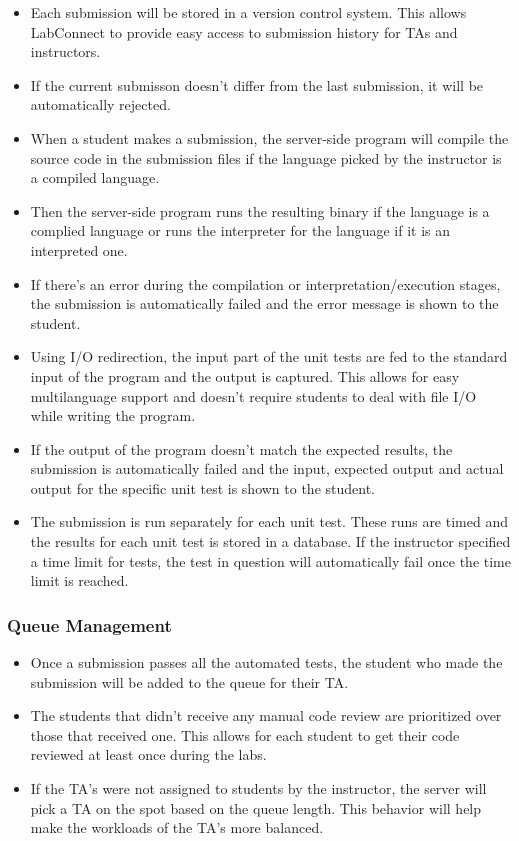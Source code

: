 \documentclass[a4paper, 12pt]{article}
\begin{document}
    \begin{itemize}
      \item Each submission will be stored in a version control system. This allows LabConnect to provide easy access to
      submission history for TAs and instructors.
      \item If the current submisson doesn't differ from the last submission, it will be automatically rejected.
      \item When a student makes a submission, the server-side program will compile the source code in the submission
      files if the language picked by the instructor is a compiled language.
      \item Then the server-side program runs the resulting binary if the language is a complied language or runs the
      interpreter for the language if it is an interpreted one.
      \item If there's an error during the compilation or interpretation/execution stages, the submission is automatically failed and
      the error message is shown to the student.
      \item Using I/O redirection, the input part of the unit tests are fed to the standard input of the program and the output is captured.
      This allows for easy multilanguage support and doesn't require students to deal with file I/O while writing the program.
      \item If the output of the program doesn't match the expected results, the submission is automatically failed and the input, expected
      output and actual output for the specific unit test is shown to the student.
      \item The submission is run separately for each unit test. These runs are timed and the results for each unit test is stored in a database.
      If the instructor specified a time limit for tests, the test in question will automatically fail once the time limit is reached.
    \end{itemize}

    \subsubsection{Queue Management}
    \begin{itemize}
      \item Once a submission passes all the automated tests, the student who made the submission will be added to the queue for their TA.
      \item The students that didn't receive any manual code review are prioritized over those that received one. This allows for each student to
      get their code reviewed at least once during the labs.
      \item If the TA's were not assigned to students by the instructor, the server will pick a TA on the spot based on the queue length. This
      behavior will help make the workloads of the TA's more balanced.
    \end{itemize}
\end{document}
